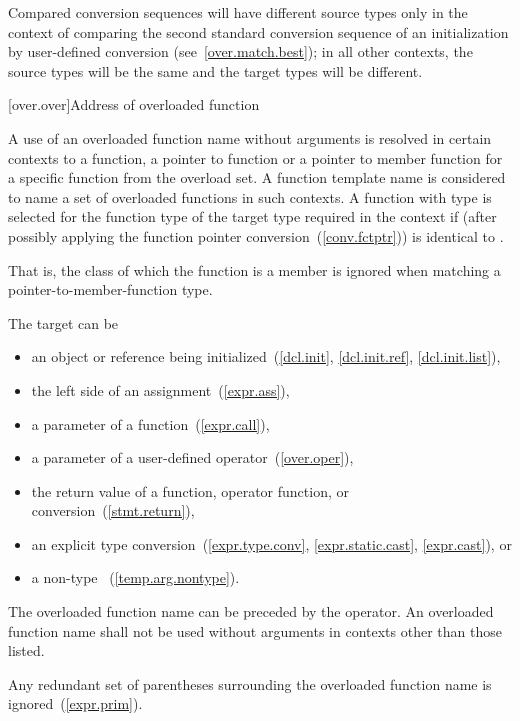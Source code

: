 \begin{itemize}
\begin{note}
Compared conversion sequences will have different source types only in the
context of comparing the second standard conversion sequence of an
initialization by user-defined conversion (see~\ref{over.match.best}); in
all other contexts, the source types will be the same and the target
types will be different.
\end{note}
\end{itemize}%
%

[over.over]{Address of overloaded function}%
%

\pnum
A use of an overloaded function name without arguments is resolved
in certain contexts to a function, a pointer to function or a pointer to
member function for a specific function from the overload set.
A function template name is considered to name a set of overloaded functions
in such contexts.
A function with type  is selected for the function type 
of the target type required in the context if 
(after possibly applying the function pointer conversion~(\ref{conv.fctptr}))
is identical to .
\begin{note}
That is, the class of which the function is a member is ignored when matching a
pointer-to-member-function type.
\end{note}
The target can be

\begin{itemize}
\item
an object or reference being initialized~(\ref{dcl.init}, \ref{dcl.init.ref},
\ref{dcl.init.list}),
\item
the left side of an assignment~(\ref{expr.ass}),
\item
a parameter of a function~(\ref{expr.call}),
\item
a parameter of a user-defined operator~(\ref{over.oper}),
\item
the return value of a function, operator function, or conversion~(\ref{stmt.return}),
\item
an explicit type conversion~(\ref{expr.type.conv}, \ref{expr.static.cast},
\ref{expr.cast}), or
\item
a non-type
~(\ref{temp.arg.nontype}).
\end{itemize}

The overloaded function name can be preceded by the
\tcode{\&}
operator.
An overloaded function name shall not be used without arguments in contexts
other than those listed.
\begin{note}
Any redundant set of parentheses surrounding the overloaded function name is
ignored~(\ref{expr.prim}).
\end{note}

